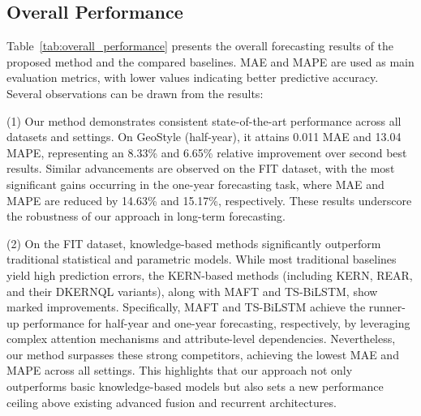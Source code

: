 \documentclass[Afour,sageh,times]{sagej}
\begin{document}
{\subsection{Overall Performance}

Table~\ref{tab:overall_performance} presents the overall forecasting results of the proposed method and the compared baselines. MAE and MAPE are used as main evaluation metrics, with lower values indicating better predictive accuracy. Several observations can be drawn from the results:

(1) Our method demonstrates consistent state-of-the-art performance across all datasets and settings. On GeoStyle (half-year), it attains 0.011 MAE and 13.04 MAPE, representing an 8.33\% and 6.65\% relative improvement over second best results. Similar advancements are observed on the FIT dataset, with the most significant gains occurring in the one-year forecasting task, where MAE and MAPE are reduced by 14.63\% and 15.17\%, respectively. These results underscore the robustness of our approach in long-term forecasting.



(2) On the FIT dataset, knowledge-based methods significantly outperform traditional statistical and parametric models. While most traditional baselines yield high prediction errors, the KERN-based methods (including KERN, REAR, and their DKERNQL variants), along with MAFT and TS-BiLSTM, show marked improvements. Specifically, MAFT and TS-BiLSTM achieve the runner-up performance for half-year and one-year forecasting, respectively, by leveraging complex attention mechanisms and attribute-level dependencies. Nevertheless, our method surpasses these strong competitors, achieving the lowest MAE and MAPE across all settings. This highlights that our approach not only outperforms basic knowledge-based models but also sets a new performance ceiling above existing advanced fusion and recurrent architectures.

}
\end{document}
